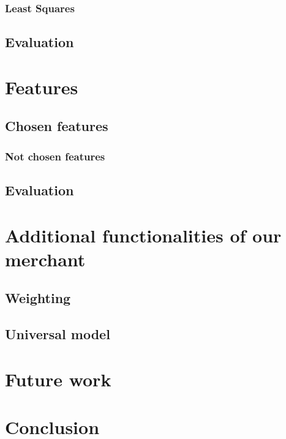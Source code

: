 \documentclass[sigconf]{acmart}
\begin{document}
\subsubsection{Least Squares}
\subsection{Evaluation}

\section{Features}
\subsection{Chosen features}
\subsubsection{Not chosen features}
\subsection{Evaluation}

\section{Additional functionalities of our merchant}
\subsection{Weighting}
\subsection{Universal model}

\section{Future work}

\section{Conclusion}





\end{document}
